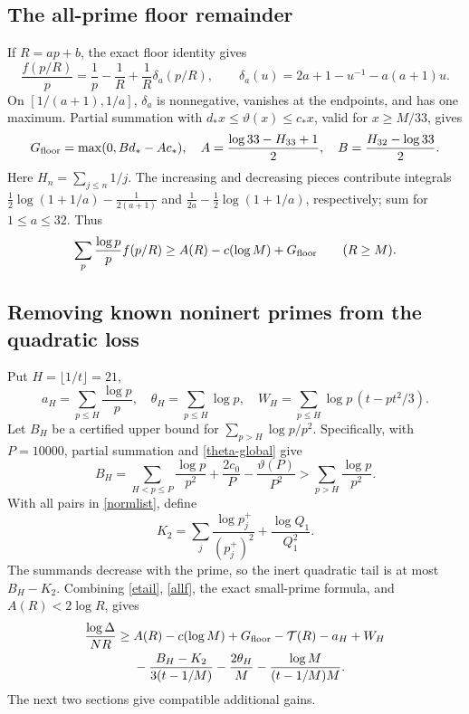 \documentclass[11pt]{article}
\newcommand{\Tn}{\mathcal T}
\begin{document}
\subsection{The all-prime floor remainder}
If \(R=ap+b\), the exact floor identity gives
\[
 \frac{f(p/R)}p=\frac1p-\frac1R+\frac1R\delta_a(p/R),\qquad
 \delta_a(u)=2a+1-u^{-1}-a(a+1)u.
\]
On \([1/(a+1),1/a]\), \(\delta_a\) is nonnegative, vanishes at
the endpoints, and has one maximum. Partial summation with
\(d_*x\le\vartheta(x)\le c_*x\), valid for \(x\ge M/33\), gives
\begin{equation}\label{Gfloor}
 G_{\rm floor}=\max(0,Bd_*-Ac_*),\quad
 A=\frac{\log33-H_{33}+1}{2},\quad
 B=\frac{H_{32}-\log33}{2}.
\end{equation}
Here \(H_n=\sum_{j\le n}1/j\). The increasing and decreasing pieces
contribute integrals
\(\frac12\log(1+1/a)-\frac1{2(a+1)}\) and
\(\frac1{2a}-\frac12\log(1+1/a)\), respectively; sum for
\(1\le a\le32\). Thus
\begin{equation}\label{allf}
 \sum_p\frac{\log p}{p}f(p/R)
 \ge A(R)-c(\log M)+G_{\rm floor}\qquad(R\ge M).
\end{equation}

\subsection{Removing known noninert primes from the quadratic loss}
Put \(H=\lfloor1/t\rfloor=21\),
\[
 a_H=\sum_{p\le H}\frac{\log p}p,\quad
 \theta_H=\sum_{p\le H}\log p,\quad
 W_H=\sum_{p\le H}\log p\,(t-pt^2/3).
\]
Let \(B_H\) be a certified upper bound for
\(\sum_{p>H}\log p/p^2\). Specifically, with \(P=10000\),
partial summation and \eqref{theta-global} give
\[
 B_H=\sum_{H<p\le P}\frac{\log p}{p^2}
               +\frac{2c_0}{P}-\frac{\vartheta(P)}{P^2}
 >\sum_{p>H}\frac{\log p}{p^2}.
\]
With all pairs in \eqref{normlist}, define
\begin{equation}\label{Ktwo}
 K_2=\sum_j\frac{\log p_j^+}{(p_j^+)^2}
             +\frac{\log Q_1}{Q_1^2}.
\end{equation}
The summands decrease with the prime, so the inert quadratic tail
is at most \(B_H-K_2\). Combining \eqref{etail}, \eqref{allf}, the
exact small-prime formula, and \(A(R)<2\log R\), gives
\begin{align}\label{basevaluation}
 \frac{\log\Delta}{NR}\ge{}&
 A(R)-c(\log M)+G_{\rm floor}-\Tn(R)-a_H+W_H\\
 &-\frac{B_H-K_2}{3(t-1/M)}
 -\frac{2\theta_H}{M}-\frac{\log M}{(t-1/M)M}.
 \notag
\end{align}
The next two sections give compatible additional gains.
\end{document}
